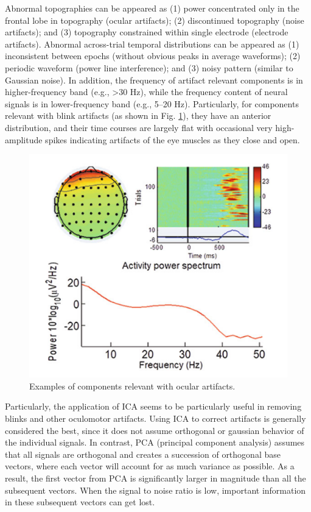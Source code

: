 \documentclass[12pt,a4paper,titlepage,openany]{report}
\begin{document}
Abnormal topographies can be appeared as (1) power concentrated only in the frontal lobe in topography (ocular artifacts); (2) discontinued topography (noise artifacts); and (3) topography constrained within single electrode (electrode artifacts). 
Abnormal across-trial temporal distributions can be appeared as (1) inconsistent between epochs (without obvious peaks in average waveforms); (2) periodic waveform (power line interference); and (3) noisy pattern (similar to Gaussian noise). 
In addition, the frequency of artifact relevant components is in higher-frequency band (e.g., \textgreater 30 Hz), while the frequency content of neural signals is in lower-frequency band (e.g., 5–20 Hz). 
Particularly, for components relevant with blink artifacts (as shown in Fig. \ref{fig:ICA}), they have an anterior distribution, and their time courses are largely ﬂat with occasional very high-amplitude spikes indicating artifacts of the eye muscles as they close and open.

\begin{figure}[h]
     \centering
     \includegraphics[scale=0.5]{./misc/ICA example of components.png}
     \caption{Examples of components relevant with ocular artifacts.}
     \label{fig:ICA}
\end{figure}

Particularly, the application of ICA seems to be particularly useful in removing blinks and other oculomotor artifacts. Using ICA to correct artifacts is generally considered the best, since it does not assume orthogonal or gaussian behavior of the individual signals. 
In contrast, PCA (principal component analysis) assumes that all signals are orthogonal and creates a succession of orthogonal base vectors, where each vector will account for as much variance as possible. 
As a result, the ﬁrst vector from PCA is signiﬁcantly larger in magnitude than all the subsequent vectors. 
When the signal to noise ratio is low, important information in these subsequent vectors can get lost.\cite{makkar2023}
\end{document}
